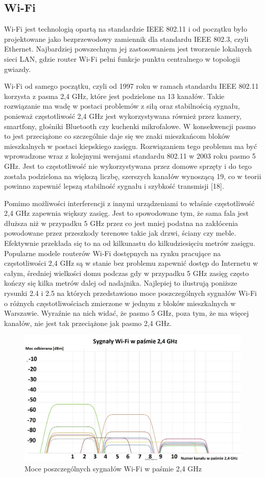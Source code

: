 \documentclass[12pt, twoside, openany]{mwrep}
\begin{document}
\subsection{Wi-Fi}

Wi-Fi jest technologią opartą na standardzie IEEE 802.11 i od początku było projektowane jako bezprzewodowy zamiennik dla standardu IEEE 802.3, czyli Ethernet. Najbardziej powszechnym jej zastosowaniem jest tworzenie lokalnych sieci LAN, gdzie router Wi-Fi pełni funkcje punktu centralnego w topologii gwiazdy. 
\par
Wi-Fi od samego początku, czyli od 1997 roku w ramach standardu IEEE 802.11 korzysta z pasma 2,4 GHz, które jest podzielone na 13 kanałów. Takie rozwiązanie ma wadę w postaci problemów z siłą oraz stabilnością sygnału, ponieważ częstotliwość 2,4 GHz jest wykorzystywana również przez kamery, smartfony, głośniki Bluetooth czy kuchenki mikrofalowe. W konsekwencji pasmo to jest przeciążone co szczególnie daje się we znaki mieszkańcom bloków mieszkalnych w postaci kiepskiego zasięgu. Rozwiązaniem tego problemu ma być wprowadzone wraz z kolejnymi wersjami standardu 802.11 w 2003 roku pasmo 5 GHz. Jest to częstotliwość nie wykorzystywana przez domowe sprzęty i do tego została podzielona na większą liczbę, szerszych kanałów wynoszącą 19, co w teorii powinno zapewnić lepszą stabilność sygnału i szybkość transmisji [18]. 
\par
Pomimo możliwości interferencji z innymi urządzeniami to właśnie częstotliwość 2,4 GHz zapewnia większy zasięg. Jest to spowodowane tym, że sama fala jest dłuższa niż w przypadku 5 GHz przez co jest mniej podatna na zakłócenia powodowane przez przeszkody terenowe takie jak drzwi, ściany czy meble. Efektywnie przekłada się to na od kilkunastu do kilkudziesięciu metrów zasięgu. Popularne modele routerów Wi-Fi dostępnych na rynku pracujące na częstotliwości 2,4 GHz są w stanie bez problemu zapewnić dostęp do Internetu w całym, średniej wielkości domu podczas gdy w przypadku 5 GHz zasięg często kończy się kilka metrów dalej od nadajnika. Najlepiej to ilustrują poniższe rysunki 2.4 i 2.5 na których przedstawiono moce poszczególnych sygnałów Wi-Fi o różnych częstotliwościach zmierzone w jednym z bloków mieszkalnych w Warszawie. Wyraźnie na nich widać, że pasmo 5 GHz, poza tym, że ma więcej kanałów, nie jest tak przeciążone jak pasmo 2,4 GHz.
\hfill \break
\begin{figure}[H]
\centering
\includegraphics[scale=0.35]{2,4GHz}
\caption{Moce poszczególnych sygnałów Wi-Fi w paśmie 2,4 GHz}
\end{figure}
\end{document}
